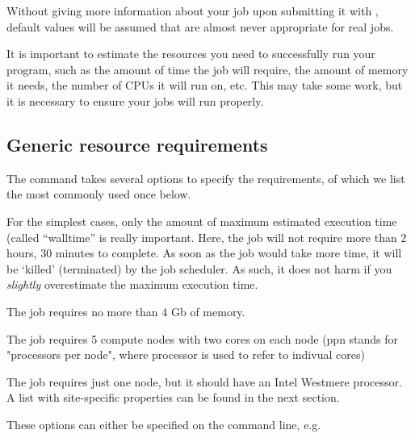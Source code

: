 Without giving more information about your job upon submitting it with
, default values will be assumed that are almost never appropriate
for real jobs.

It is important to estimate the resources you need to successfully run your
program, such as the amount of time the job will require, the amount of memory
it needs, the number of CPUs it will run on, etc. This may take some work, but
it is necessary to ensure your jobs will run properly.

\subsection{Generic resource requirements}

The  command takes several options to specify the requirements, of which we
list the most commonly used once below.

\begin{prompt}
\end{prompt}

For the simplest cases, only the amount of maximum estimated execution time
(called ``walltime'' is really important. Here, the job will not require more
than 2 hours, 30 minutes to complete. As soon as the job would take more time,
it will be `killed' (terminated) by the job scheduler.  As such, it does not
harm if you \emph{slightly} overestimate the maximum execution time.

\begin{prompt}
\end{prompt}

The job requires no more than 4 Gb of memory.

\begin{prompt}
\end{prompt}

The job requires 5 compute nodes with two cores on each node (ppn stands for
"processors per node", where processor is used to refer to indivual cores)

\begin{prompt}
\end{prompt}

The job requires just one node, but it should have an Intel Westmere processor.
A list with site-specific properties can be found in the next section.

These options can either be specified on the command line, e.g.

